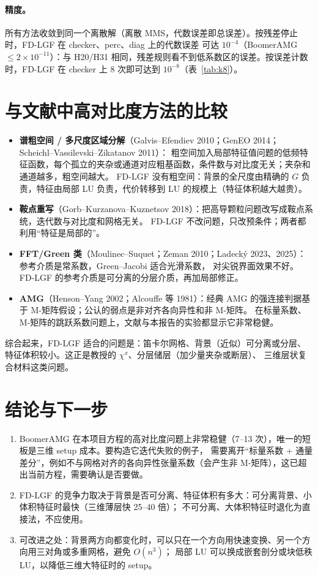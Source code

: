 \documentclass[11pt,a4paper]{ctexart}
\begin{document}
\paragraph{精度。}所有方法收敛到同一个离散解（离散 MMS，代数误差即总误差）。按残差停止时，FD-LGF 在 checker、perc、diag 上的代数误差
可达 $10^{-4}$（BoomerAMG $\le2\times10^{-11}$）：与 H20/H31 相同，残差规则看不到低系数区的误差。按误差计数时，FD-LGF 在 checker 上 8 次即可达到 $10^{-8}$（表~\ref{tab:k8}）。

\section{与文献中高对比度方法的比较}\label{sec:lit}
\begin{itemize}
\item \textbf{谱粗空间 / 多尺度区域分解}（Galvis--Efendiev 2010；GenEO 2014；Scheichl--Vassilevski--Zikatanov 2011）：
  粗空间加入局部特征值问题的低频特征函数，每个孤立的夹杂或通道对应粗基函数，条件数与对比度无关；夹杂和通道越多，粗空间越大。
  FD-LGF 没有粗空间：背景的全尺度由精确的 $G$ 负责，特征由局部 LU 负责，代价转移到 LU 的规模上（特征体积越大越贵）。
\item \textbf{鞍点重写}（Gorb--Kurzanova--Kuznetsov 2018）：把高导颗粒问题改写成鞍点系统，迭代数与对比度和网格无关。
  FD-LGF 不改问题，只改预条件；两者都利用“特征是局部的”。
\item \textbf{FFT/Green 类}（Moulinec--Suquet；Zeman 2010；Ladecký 2023、2025）：参考介质是常系数，Green--Jacobi 适合光滑系数，
  对尖锐界面效果不好。FD-LGF 的参考介质是可分离的分层介质，再加局部修正。
\item \textbf{AMG}（Henson--Yang 2002；Alcouffe 等 1981）：经典 AMG 的强连接判据基于 M-矩阵假设；公认的弱点是非对齐各向异性和非 M-矩阵。
  在标量系数、M-矩阵的跳跃系数问题上，文献与本报告的实验都显示它非常稳健。
\end{itemize}
综合起来，FD-LGF 适合的问题是：笛卡尔网格、背景（近似）可分离或分层、特征体积较小。这正是教授的 $\chi^x$、分层储层（加少量夹杂或断层）、
三维层状复合材料这类问题。

\section{结论与下一步}
\begin{enumerate}
\item BoomerAMG 在本项目方程的高对比度问题上非常稳健（7--13 次），唯一的短板是三维 setup 成本。要构造它迭代失败的例子，
  需要离开“标量系数 + 通量差分”，例如不与网格对齐的各向异性张量系数（会产生非 M-矩阵），这已超出当前方程，需要确认是否要做。
\item FD-LGF 的竞争力取决于背景是否可分离、特征体积有多大：可分离背景、小体积特征时最快（三维薄层快 25--40 倍）；
  不可分离、大体积特征时退化为直接法，不应使用。
\item 可改进之处：背景两方向都变化时，可以只在一个方向用快速变换、另一个方向用三对角或多重网格，避免 $O(n^3)$；
  局部 LU 可以换成嵌套剖分或块低秩 LU，以降低三维大特征时的 setup。
\end{enumerate}
\end{document}

